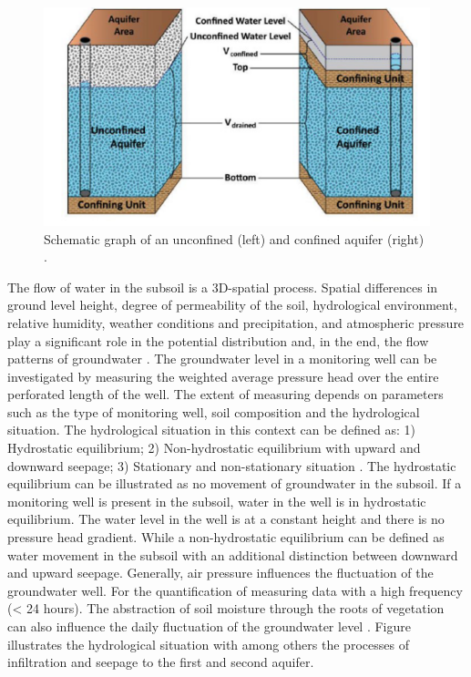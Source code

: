 \begin{figure}[h]
    \centering
    \includegraphics[width=0.95\linewidth]{figures/figures theory/Jones et al.png}
    \caption{Schematic graph of an unconfined (left) and confined aquifer (right) \cite{jones-2013}.}
    \label{aquifer}
\end{figure}
\noindent
The flow of water in the subsoil is a 3D-spatial process. Spatial differences in ground level height, degree of permeability of the soil, hydrological environment, relative humidity, weather conditions and precipitation, and atmospheric pressure play a significant role in the potential distribution and, in the end, the flow patterns of groundwater \cite{dufour-1998}. The groundwater level in a monitoring well can be investigated by measuring the weighted average pressure head over the entire perforated length of the well. 
The extent of measuring depends on parameters such as the type of monitoring well, soil composition and the hydrological situation. The hydrological situation in this context can be defined as: 1) Hydrostatic equilibrium; 2) Non-hydrostatic equilibrium with upward and downward seepage; 3) Stationary and non-stationary situation \cite{ritzema-2012}. The hydrostatic equilibrium can be illustrated as no movement of groundwater in the subsoil. If a monitoring well is present in the subsoil, water in the well is in hydrostatic equilibrium. The water level in the well is at a constant height and there is no pressure head gradient. While a non-hydrostatic equilibrium can be defined as water movement in the subsoil with an additional distinction between downward and upward seepage. Generally, air pressure influences the fluctuation of the groundwater well. For the quantification of measuring data with a high frequency (< 24 hours). The abstraction of soil moisture through the roots of vegetation can also influence the daily fluctuation of the groundwater level \cite{ritzema-2012}. Figure  illustrates the hydrological situation with among others the processes of infiltration and seepage to the first and second aquifer. 

